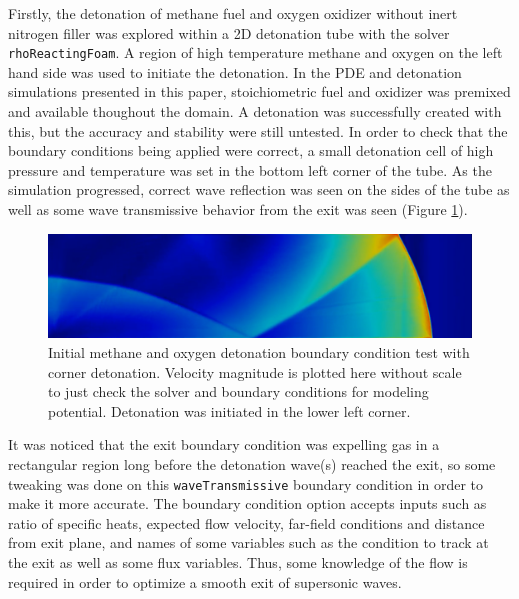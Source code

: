 Firstly, the detonation of methane fuel and oxygen oxidizer without inert nitrogen filler was explored within a 2D detonation tube with the solver \verb|rhoReactingFoam|. A region of high temperature methane and oxygen on the left hand side was used to initiate the detonation. In the PDE and detonation simulations presented in this paper, stoichiometric fuel and oxidizer was premixed and available thoughout the domain. 
A detonation was successfully created with this, but the accuracy and stability were still untested. In order to check that the boundary conditions being applied were correct, a small detonation cell of high pressure and temperature was set in the bottom left corner of the tube. As the simulation progressed, correct wave reflection was seen on the sides of the tube as well as some wave transmissive behavior from the exit was seen (Figure \ref{fig:cornerdet}). 
\begin{figure}[b]
\centering
\includegraphics[width=\linewidth]{figs/cornerdet.png}
\caption{Initial methane and oxygen detonation boundary condition test with corner detonation. Velocity magnitude is plotted here without scale to just check the solver and boundary conditions for modeling potential. Detonation was initiated in the lower left corner.}
\label{fig:cornerdet}
\end{figure}%
\noindent It was noticed that the exit boundary condition was expelling gas in a rectangular region long before the detonation wave(s) reached the exit, so some tweaking was done on this \verb|waveTransmissive| boundary condition in order to make it more accurate. The boundary condition option accepts inputs such as ratio of specific heats, expected flow velocity, far-field conditions and distance from exit plane, and names of some variables such as the condition to track at the exit as well as some flux variables. Thus, some knowledge of the flow is required in order to optimize a smooth exit of supersonic waves. 

